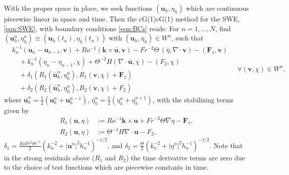 With the proper space in place, we seek functions $(\mathbf{u}_h, \eta_h)$ which
are continuous piecewise linear in space and time. Then the cG(1)cG(1) method
for the SWE, \eqref{eqn:SWE}, with boundary conditions \eqref{eqn:BCs} reads:
For $n = 1, \dots, N$, find $(\mathbf{u}_h^n, \eta_h^n) \equiv
(\mathbf{u}_h(t_n), \eta_h(t_n))$ with $(\mathbf{u}_h, \eta_h) \in W^n$, such
that
\begin{equation}
  \begin{split}
    &k_n^{-1}(\mathbf{u}_n - \mathbf{u}_{n-1}, \mathbf{v}) + Ro^{-1}(\mathbf{k} \times
    \bar{\mathbf{u}}, \mathbf{v}) - Fr^{-2}\Theta\,(\bar{\eta}, \nabla\cdot \mathbf{v}) -
        (\mathbf{F}_1,\mathbf{v}) \\
    &\quad+ k_n^{-1}(\eta_n - \eta_{n-1}, \chi) 
      + \Theta^{-2}H (\nabla\cdot \bar{\mathbf{u}},\chi) - (F_2,\chi)\\
    &\quad+ \delta_1 ( R_1(\bar{\mathbf{u}}_h^n, \eta_h^n),
      R_1(\mathbf{v}, \chi) + \mathbf{F}_1) \\
    &\quad+ \delta_2 (R_2(\bar{\mathbf{u}}_h^n, \eta_h^n),
        R_2(\mathbf{v}, \chi) + F_2)
  \end{split}
  \quad \forall (\mathbf{v},\chi) \in W^n,
  \label{eqn:cG1cG1}
\end{equation}
where $\bar{\mathbf{u}}_h^n = \frac{1}{2}(\mathbf{u}_h^n + \mathbf{u}_h^{n-1}),\,
\bar{\eta}_h^n = \frac{1}{2}(\eta_h^n + \eta_h^{n+1})$, with the stabilizing
terms given by
\begin{align*}
  R_1(\mathbf{u},\eta) &:= Ro^{-1}\mathbf{k} \times \mathbf{u} 
    + Fr^{-2} \Theta \nabla \eta - \mathbf{F}_1, \\
  R_2(\mathbf{u},\eta) &:= \Theta^{-1} H \nabla\cdot \mathbf{u} - F_2,
\end{align*}
$\delta_1 = \frac{RoFr^2\Theta^{-1}}{2}(k_n^{-2} + |\mathbf{u}^n|^2 h_n^{-1})^{-1/2}$, and
$\delta_2 = \frac{\Theta}{2}(k_n^{-2} + |\eta^n|^2 h_n^{-1})^{-1/2}$. Note that in
the strong residuals above ($R_1$ and $R_2$) the time derivative terms are zero
due to the choice of test functions which are piecewise constants in time.
